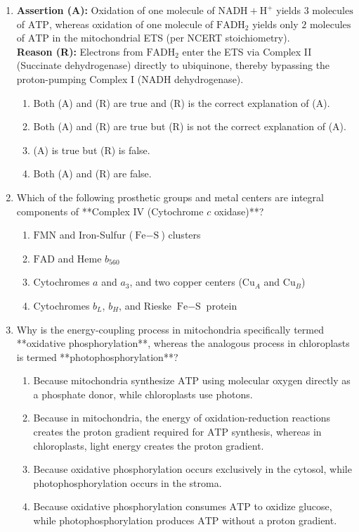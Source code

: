 \documentclass[11pt, a4paper]{article}
\begin{document}
\begin{enumerate}[label=\textbf{\arabic*.}]
\item \textbf{Assertion (A):} Oxidation of one molecule of $\text{NADH} + \text{H}^+$ yields $3\text{ molecules}$ of $\text{ATP}$, whereas oxidation of one molecule of $\text{FADH}_2$ yields only $2\text{ molecules}$ of $\text{ATP}$ in the mitochondrial ETS (per NCERT stoichiometry). \\
\textbf{Reason (R):} Electrons from $\text{FADH}_2$ enter the ETS via Complex II (Succinate dehydrogenase) directly to ubiquinone, thereby bypassing the proton-pumping Complex I ($\text{NADH}$ dehydrogenase).
\begin{enumerate}[label=(\Alph*)]
    \item Both (A) and (R) are true and (R) is the correct explanation of (A).
    \item Both (A) and (R) are true but (R) is not the correct explanation of (A).
    \item (A) is true but (R) is false.
    \item Both (A) and (R) are false.
\end{enumerate}

\item Which of the following prosthetic groups and metal centers are integral components of **Complex IV (Cytochrome $c$ oxidase)**?
\begin{enumerate}[label=(\Alph*)]
    \item $\text{FMN}$ and Iron-Sulfur ($\text{Fe}-\text{S}$) clusters
    \item $\text{FAD}$ and Heme $b_{560}$
    \item Cytochromes $a$ and $a_3$, and two copper centers ($\text{Cu}_A$ and $\text{Cu}_B$)
    \item Cytochromes $b_L$, $b_H$, and Rieske $\text{Fe}-\text{S}$ protein
\end{enumerate}

\item Why is the energy-coupling process in mitochondria specifically termed **oxidative phosphorylation**, whereas the analogous process in chloroplasts is termed **photophosphorylation**?
\begin{enumerate}[label=(\Alph*)]
    \item Because mitochondria synthesize $\text{ATP}$ using molecular oxygen directly as a phosphate donor, while chloroplasts use photons.
    \item Because in mitochondria, the energy of oxidation-reduction reactions creates the proton gradient required for $\text{ATP}$ synthesis, whereas in chloroplasts, light energy creates the proton gradient.
    \item Because oxidative phosphorylation occurs exclusively in the cytosol, while photophosphorylation occurs in the stroma.
    \item Because oxidative phosphorylation consumes $\text{ATP}$ to oxidize glucose, while photophosphorylation produces $\text{ATP}$ without a proton gradient.
\end{enumerate}


\end{enumerate}
\end{document}
